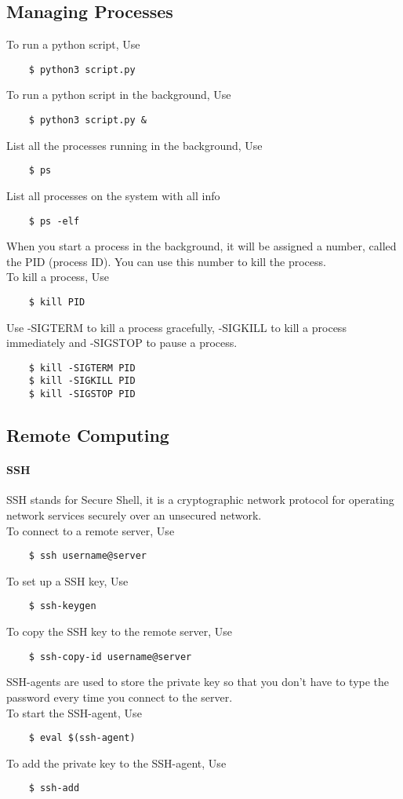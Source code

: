 \documentclass[12pt,a4paper]{article}
\begin{document}
\subsection{Managing Processes}
To run a python script, Use
\begin{lstlisting}
    $ python3 script.py
\end{lstlisting}
To run a python script in the background, Use
\begin{lstlisting}
    $ python3 script.py &
\end{lstlisting}
List all the processes running in the background, Use
\begin{lstlisting}
    $ ps
\end{lstlisting}
List all processes on the system with all info
\begin{lstlisting}
    $ ps -elf
\end{lstlisting}
When you start a process in the background, it will be assigned a number, called the PID (process ID). You can use this number to kill the process.\\
To kill a process, Use
\begin{lstlisting}
    $ kill PID
\end{lstlisting}
Use -SIGTERM to kill a process gracefully, -SIGKILL to kill a process immediately and -SIGSTOP to pause a process.\\
\begin{lstlisting}
    $ kill -SIGTERM PID
    $ kill -SIGKILL PID
    $ kill -SIGSTOP PID
\end{lstlisting}
\subsection{Remote Computing}
\paragraph{SSH}
SSH stands for Secure Shell, it is a cryptographic network protocol for operating network services securely over an unsecured network.\\
To connect to a remote server, Use
\begin{lstlisting}
    $ ssh username@server
\end{lstlisting}
To set up a SSH key, Use
\begin{lstlisting}
    $ ssh-keygen
\end{lstlisting}
To copy the SSH key to the remote server, Use
\begin{lstlisting}
    $ ssh-copy-id username@server
\end{lstlisting}
SSH-agents are used to store the private key so that you don't have to type the password every time you connect to the server.\\
To start the SSH-agent, Use
\begin{lstlisting}
    $ eval $(ssh-agent)
\end{lstlisting}
To add the private key to the SSH-agent, Use
\begin{lstlisting}
    $ ssh-add
\end{lstlisting}
\end{document}
